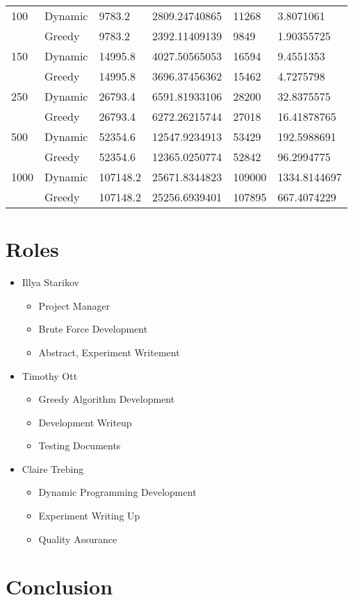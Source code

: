 \documentclass{article}
\begin{document}
\begin{adjustwidth}{-.35cm}{}
\begin{center}
\begin{tabular}{l|lllll}
100     & Dynamic & 9783.2    & 2809.24740865    & 11268    &  3.8071061            \\
        & Greedy  & 9783.2    & 2392.11409139    & 9849     &  1.90355725           \\ \midrule
150     & Dynamic & 14995.8   & 4027.50565053    & 16594    &  9.4551353            \\
        & Greedy  & 14995.8   & 3696.37456362    & 15462    &  4.7275798            \\ \midrule
250     & Dynamic & 26793.4   & 6591.81933106    & 28200    &  32.8375575           \\
        & Greedy  & 26793.4   & 6272.26215744    & 27018    &  16.41878765          \\ \midrule
500     & Dynamic & 52354.6   & 12547.9234913    & 53429    &  192.5988691          \\
        & Greedy  & 52354.6   & 12365.0250774    & 52842    &  96.2994775           \\ \midrule
1000    & Dynamic & 107148.2  & 25671.8344823    & 109000   &  1334.8144697         \\
        & Greedy  & 107148.2  & 25256.6939401    & 107895   &  667.4074229          \\
        \bottomrule
        \end{tabular}
    \end{center}
\end{adjustwidth}

\section{Roles}
\begin{itemize}
    \item Illya Starikov
    \begin{itemize}
        \item Project Manager
        \item Brute Force Development
        \item Abstract, Experiment Writement
    \end{itemize}
    \item Timothy Ott
    \begin{itemize}
        \item Greedy Algorithm Development
        \item Development Writeup
        \item Testing Documents
    \end{itemize}

    \item Claire Trebing
    \begin{itemize}
        \item Dynamic Programming Development
        \item Experiment Writing Up
        \item Quality Assurance
    \end{itemize}
\end{itemize}

\section{Conclusion}
\end{document}
